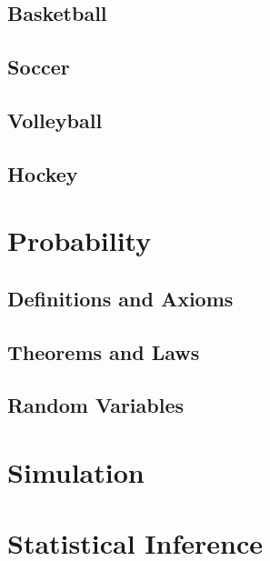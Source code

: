 \documentclass[
]{book}
\theoremstyle{definition}
\theoremstyle{definition}
\theoremstyle{definition}
\theoremstyle{definition}
\theoremstyle{remark}
\begin{document}
\hypertarget{basketball}{%
\section{Basketball}\label{basketball}}

\hypertarget{soccer}{%
\section{Soccer}\label{soccer}}

\hypertarget{volleyball}{%
\section{Volleyball}\label{volleyball}}

\hypertarget{hockey}{%
\section{Hockey}\label{hockey}}

\hypertarget{probability}{%
\chapter{Probability}\label{probability}}

\hypertarget{definitions-and-axioms}{%
\section{Definitions and Axioms}\label{definitions-and-axioms}}

\hypertarget{theorems-and-laws}{%
\section{Theorems and Laws}\label{theorems-and-laws}}

\hypertarget{random-variables}{%
\section{Random Variables}\label{random-variables}}

\hypertarget{simulation}{%
\chapter{Simulation}\label{simulation}}

\hypertarget{statistical-inference}{%
\chapter{Statistical Inference}\label{statistical-inference}}
\end{document}
